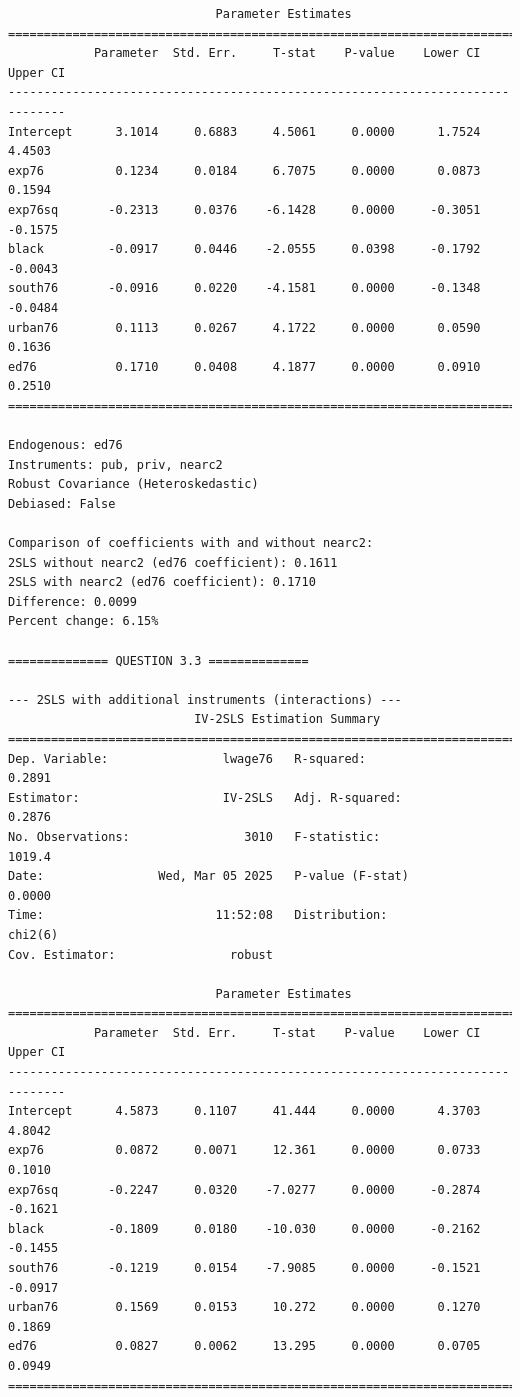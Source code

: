 \documentclass[10pt]{article}
\begin{document}
\begin{verbatim}
                             Parameter Estimates                              
==============================================================================
            Parameter  Std. Err.     T-stat    P-value    Lower CI    Upper CI
------------------------------------------------------------------------------
Intercept      3.1014     0.6883     4.5061     0.0000      1.7524      4.4503
exp76          0.1234     0.0184     6.7075     0.0000      0.0873      0.1594
exp76sq       -0.2313     0.0376    -6.1428     0.0000     -0.3051     -0.1575
black         -0.0917     0.0446    -2.0555     0.0398     -0.1792     -0.0043
south76       -0.0916     0.0220    -4.1581     0.0000     -0.1348     -0.0484
urban76        0.1113     0.0267     4.1722     0.0000      0.0590      0.1636
ed76           0.1710     0.0408     4.1877     0.0000      0.0910      0.2510
==============================================================================

Endogenous: ed76
Instruments: pub, priv, nearc2
Robust Covariance (Heteroskedastic)
Debiased: False

Comparison of coefficients with and without nearc2:
2SLS without nearc2 (ed76 coefficient): 0.1611
2SLS with nearc2 (ed76 coefficient): 0.1710
Difference: 0.0099
Percent change: 6.15%

============== QUESTION 3.3 ==============

--- 2SLS with additional instruments (interactions) ---
                          IV-2SLS Estimation Summary                          
==============================================================================
Dep. Variable:                lwage76   R-squared:                      0.2891
Estimator:                    IV-2SLS   Adj. R-squared:                 0.2876
No. Observations:                3010   F-statistic:                    1019.4
Date:                Wed, Mar 05 2025   P-value (F-stat)                0.0000
Time:                        11:52:08   Distribution:                  chi2(6)
Cov. Estimator:                robust                                         
                                                                              
                             Parameter Estimates                              
==============================================================================
            Parameter  Std. Err.     T-stat    P-value    Lower CI    Upper CI
------------------------------------------------------------------------------
Intercept      4.5873     0.1107     41.444     0.0000      4.3703      4.8042
exp76          0.0872     0.0071     12.361     0.0000      0.0733      0.1010
exp76sq       -0.2247     0.0320    -7.0277     0.0000     -0.2874     -0.1621
black         -0.1809     0.0180    -10.030     0.0000     -0.2162     -0.1455
south76       -0.1219     0.0154    -7.9085     0.0000     -0.1521     -0.0917
urban76        0.1569     0.0153     10.272     0.0000      0.1270      0.1869
ed76           0.0827     0.0062     13.295     0.0000      0.0705      0.0949
==============================================================================


\end{verbatim}
\end{document}
